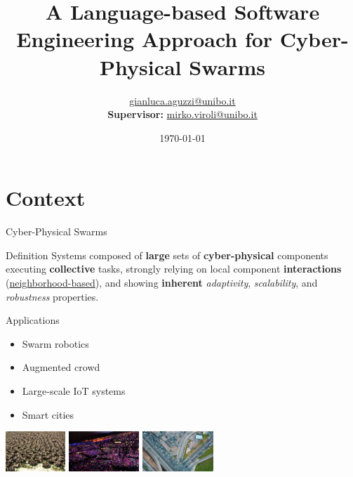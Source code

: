 \documentclass[presentation, 8pt,169]{beamer}\mode<presentation>{\usetheme{AMSBolognaFC}}
\title[A Soft-Eng Approach for CPSWs]
{A Language-based Software Engineering Approach for Cyber-Physical Swarms}
\author[\sspeaker{G.Aguzzi}]
{\speaker{Gianluca Aguzzi} \href{mailto:gianluca.aguzzi@unibo.it}{gianluca.aguzzi@unibo.it} \\
\textbf{Supervisor:} \speaker{Mirko Viroli} \href{mailto:mirko.viroli@unibo.it}{mirko.viroli@unibo.it}}
\institute[DISI, Univ.\ Bologna]
{%
\textsc{Alma Mater Studiorum} -- Universit{\`a} di Bologna \\[0.1cm]
\textbf{PhD defense}\\[0.15cm]
}
\date[\today]{\today}
\begin{document}

\frame{\titlepage}

\section*{\refname}

\section{Context}
\begin{frame}{Cyber-Physical Swarms}
  \begin{exampleblock}{Definition}
    Systems composed of \textbf{large} sets of \textbf{cyber-physical} components executing \textbf{collective} tasks, strongly relying on local component \textbf{interactions} (\underline{neighborhood-based}), and showing \textbf{inherent} \emph{adaptivity}, \emph{scalability}, and \emph{robustness} properties.
\end{exampleblock}
\begin{alertblock}{Applications}
  \begin{multicols}{3}
    \begin{itemize}
      \item Swarm robotics
      \item Augmented crowd %
      \item Large-scale IoT systems
      \item Smart cities
    \end{itemize}
  \end{multicols}
  \begin{center}
    \includegraphics[height=1.5cm]{img/swarms.jpg}
    \includegraphics[height=1.5cm]{img/coldplay.jpg}
    \includegraphics[height=1.5cm]{img/traffic.jpg} 

\end{center}
\end{alertblock}
\end{frame}
\end{document}
